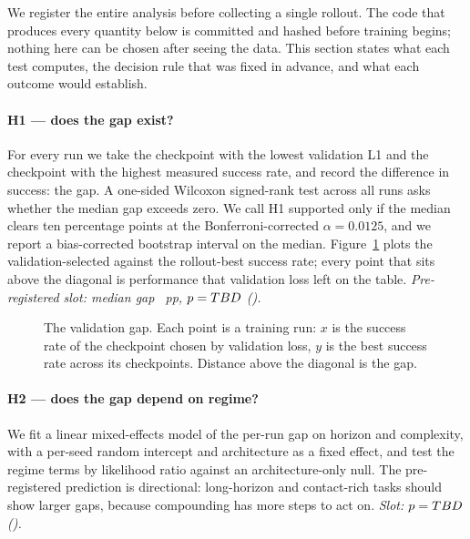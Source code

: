 
We register the entire analysis before collecting a single rollout. The code that produces
every quantity below is committed and hashed before training begins; nothing here can be
chosen after seeing the data. This section states what each test computes, the decision rule
that was fixed in advance, and what each outcome would establish.

\paragraph{H1 --- does the gap exist?} For every run we take the checkpoint with the lowest
validation L1 and the checkpoint with the highest measured success rate, and record the
difference in success: the gap. A one-sided Wilcoxon signed-rank test across all \NRuns{}
runs asks whether the median gap exceeds zero. We call H1 supported only if the median clears
ten percentage points at the Bonferroni-corrected $\alpha = 0.0125$, and we report a
bias-corrected bootstrap interval on the median. Figure~\ref{fig:headline} plots the
validation-selected against the rollout-best success rate; every point that sits above the
diagonal is performance that validation loss left on the table. \emph{Pre-registered slot:
median gap \HoneGap{}~pp, $p = TBD{}$ (\HoneSupported{}).}

\begin{figure}[t]\centering
{}
\caption{The validation gap. Each point is a training run: $x$ is the success rate of the
checkpoint chosen by validation loss, $y$ is the best success rate across its checkpoints.
Distance above the diagonal is the gap.}
\label{fig:headline}
\end{figure}

\paragraph{H2 --- does the gap depend on regime?} We fit a linear mixed-effects model of the
per-run gap on horizon and complexity, with a per-seed random intercept and architecture as a
fixed effect, and test the regime terms by likelihood ratio against an architecture-only null.
The pre-registered prediction is directional: long-horizon and contact-rich tasks should show
larger gaps, because compounding has more steps to act on. \emph{Slot: $p = TBD{}$
(\HtwoSupported{}).}

